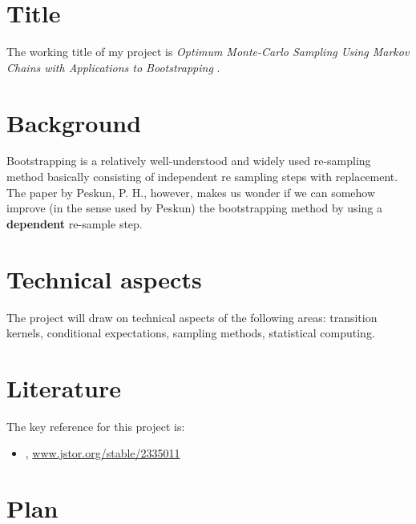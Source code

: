 \documentclass[]{STAT_547C}
\begin{document}
\vspace{-2cm}


\section{Title}

The working title of my project is \emph{
Optimum Monte-Carlo Sampling Using Markov Chains with Applications to Bootstrapping
}.  

\section{Background}

Bootstrapping is a relatively well-understood and widely used re-sampling method basically consisting of independent re sampling steps with replacement. The paper by Peskun, P. H., however, makes us wonder if we can somehow improve (in the sense used by Peskun) the bootstrapping method by using a \textbf{dependent} re-sample step.

\section{Technical aspects}

The project will draw on technical aspects of the following areas: transition kernels, conditional expectations, sampling methods, statistical computing.


\section{Literature}

The key reference for this project is:

\begin{itemize}
\item \citet{Peskun, P. H. ``Optimum Monte-Carlo Sampling Using Markov Chains.'' Biometrika, vol. 60, no. 3, 1973, pp. 607-612. JSTOR}, \href{www.jstor.org/stable/2335011}{www.jstor.org/stable/2335011}
\end{itemize}


\section{Plan}
\end{document}
